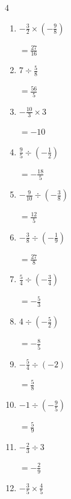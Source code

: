 \begin{multicols}{4}
\begin{enumerate}
        $\displaystyle =-\frac{3}{14}$

  \item $\displaystyle -\frac{3}{2}\times{}\left(-\frac{9}{8}\right)$

        $\displaystyle =\frac{27}{16}$

  \item $\displaystyle 7\div{}\frac{5}{8}$

        $\displaystyle =\frac{56}{5}$

  \item $\displaystyle -\frac{10}{3}\times{}3$

        $\displaystyle =-10$

  \item $\displaystyle \frac{9}{5}\div{}\left(-\frac{1}{2}\right)$

        $\displaystyle =-\frac{18}{5}$

  \item $\displaystyle -\frac{9}{10}\div{}\left(-\frac{3}{8}\right)$

        $\displaystyle =\frac{12}{5}$

\columnbreak %

\resetques

  \item $\displaystyle -\frac{3}{8}\div{}\left(-\frac{1}{9}\right)$

        $\displaystyle =\frac{27}{8}$

  \item $\displaystyle \frac{5}{4}\div{}\left(-\frac{3}{4}\right)$

        $\displaystyle =-\frac{5}{3}$

  \item $\displaystyle 4\div{}\left(-\frac{5}{2}\right)$

        $\displaystyle =-\frac{8}{5}$

  \item $\displaystyle -\frac{5}{4}\div{}\left(-2\right)$

        $\displaystyle =\frac{5}{8}$

  \item $\displaystyle -1\div{}\left(-\frac{9}{5}\right)$

        $\displaystyle =\frac{5}{9}$

  \item $\displaystyle -\frac{2}{3}\div{}3$

        $\displaystyle =-\frac{2}{9}$

  \item $\displaystyle -\frac{3}{5}\times{}\frac{4}{5}$


\end{enumerate}
\end{multicols}
